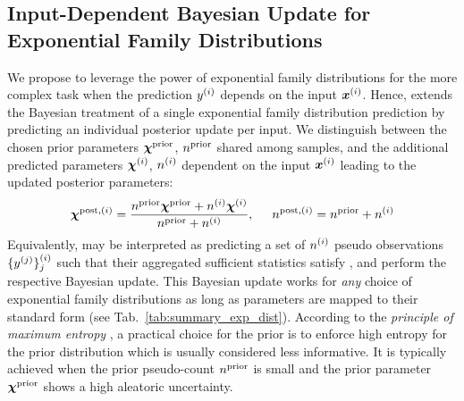 \subsection{Input-Dependent Bayesian Update for Exponential Family Distributions}
We propose to leverage the power of exponential family distributions for the more complex task when the prediction $y^{(i)}$  depends on the input $\bm{x}^{(i)}$. Hence, \NatPNacro{} extends the Bayesian treatment of a single exponential family distribution prediction by predicting an individual posterior update per input. We distinguish between the chosen prior parameters $\bm{\chi}^\text{prior}$, $n^\text{prior}$ shared among samples, and the additional predicted parameters $\bm{\chi}^{(i)}$, $n^{(i)}$ dependent on the input $\bm{x}^{(i)}$ leading to the updated posterior parameters:
%
\begin{equation}\label{eq:parameter-update}
    \bm{\chi}^{\text{post},(i)} = \frac{n^\text{prior}\bm{\chi}^\text{prior} + n^{(i)} \bm{\chi}^{(i)}}{n^\text{prior} + n^{(i)}}, \hspace{5mm}
    n^{\text{post},(i)} = n^\text{prior} + n^{(i)}
\end{equation}
%
Equivalently, \NatPNacro{} may be interpreted as predicting a set of $n^{(i)}$ pseudo observations $\{y^{(j)}\}_{j}^{(i)}$ such that their aggregated sufficient statistics satisfy , and perform the respective Bayesian update.
%
%
This Bayesian update works for \emph{any} choice of exponential family distributions as long as parameters are mapped to their standard form (see Tab.~\ref{tab:summary_exp_dist}). According to the \emph{principle of maximum entropy} \citep{maximum-entropy-principle}, a practical choice for the prior is to enforce high entropy for the prior distribution which is usually considered less informative. It is typically achieved when the prior pseudo-count $n^\text{prior}$ is small and the prior parameter $\bm{\chi}^\text{prior}$ shows a high aleatoric uncertainty.

